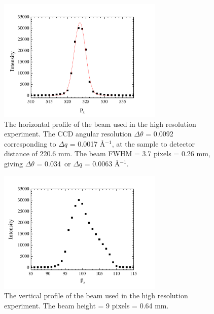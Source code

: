 \begin{figure}[htbp]
  \centering
  \includegraphics[width=0.7\textwidth]{figures/ripple/MMs/waxs/beamx_hr}
  \caption{The horizontal profile of the beam used in the high resolution 
  experiment. The CCD angular resolution $\Delta\theta$ = 0.0092\textdegree\,
  corresponding to $\Delta q$ = 0.0017 \AA$^{-1}$, at the sample to detector
  distance of 220.6 mm. The beam FWHM = 3.7 pixels = 0.26 mm, giving
  $\Delta\theta$ = 0.034\textdegree\ or $\Delta q$ = 0.0063 \AA$^{-1}$. }
  \label{fig:NGIWAXS_beamx}
\end{figure} 

\begin{figure}[htbp]
  \centering
  \includegraphics[width=0.7\textwidth]{figures/ripple/MMs/waxs/beamz_hr}
  \caption{The vertical profile of the beam used in the high resolution experiment.
  The beam height = 9 pixels = 0.64 mm.}
  \label{fig:NGIWAXS_beamz}
\end{figure} 

